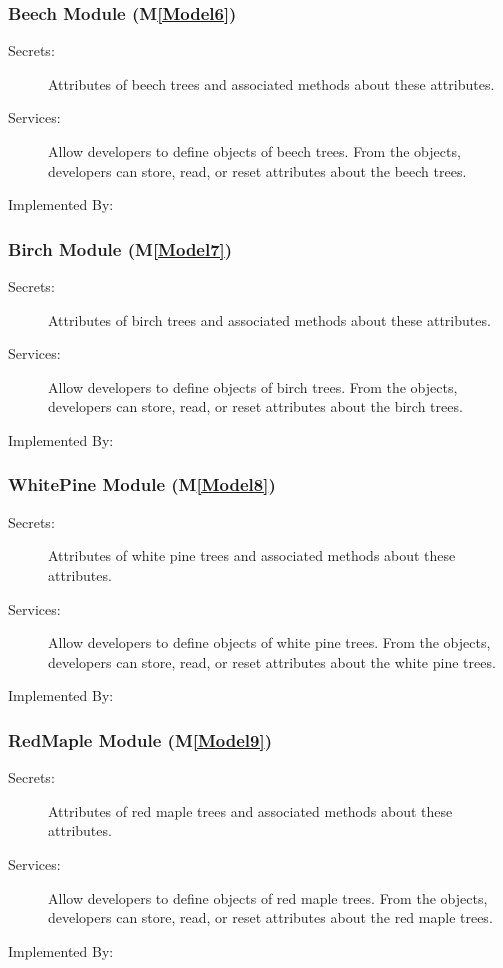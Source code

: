 \documentclass[12pt, titlepage]{article}
\newcommand{\mref}[1]{M\ref{#1}}
\begin{document}
\newcommand\tn{beech }
\newcommand\TN{Beech }
\subsubsection{\TN Module (\mref{Model6})}
\begin{description}
\item[Secrets:] Attributes of \tn trees and associated methods about these attributes.
\item[Services:] Allow developers to define objects of \tn trees. From the objects, developers can store,
read, or reset attributes about the \tn trees.
\item[Implemented By:] \progname{}
\end{description}

\renewcommand\tn{birch }
\renewcommand\TN{Birch }
\subsubsection{\TN Module (\mref{Model7})}
\begin{description}
\item[Secrets:] Attributes of \tn trees and associated methods about these attributes.
\item[Services:] Allow developers to define objects of \tn trees. From the objects, developers can store,
read, or reset attributes about the \tn trees.
\item[Implemented By:] \progname{}
\end{description}

\renewcommand\tn{white pine }
\renewcommand\TN{WhitePine }
\subsubsection{\TN Module (\mref{Model8})}
\begin{description}
\item[Secrets:] Attributes of \tn trees and associated methods about these attributes.
\item[Services:] Allow developers to define objects of \tn trees. From the objects, developers can store,
read, or reset attributes about the \tn trees.
\item[Implemented By:] \progname{}
\end{description}

\renewcommand\tn{red maple }
\renewcommand\TN{RedMaple }
\subsubsection{\TN Module (\mref{Model9})}
\begin{description}
\item[Secrets:] Attributes of \tn trees and associated methods about these attributes.
\item[Services:] Allow developers to define objects of \tn trees. From the objects, developers can store,
read, or reset attributes about the \tn trees.
\item[Implemented By:] \progname{}
\end{description}
\end{document}
